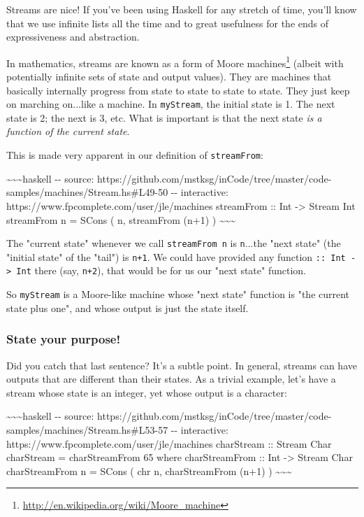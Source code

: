 \documentclass[]{article}
\renewcommand{\href}[2]{#2\footnote{\url{#1}}}
\begin{document}
Streams are nice! If you've been using Haskell for any stretch of time, you'll
know that we use infinite lists all the time and to great usefulness for the
ends of expressiveness and abstraction.

In mathematics, streams are known as a form of
\href{http://en.wikipedia.org/wiki/Moore_machine}{Moore machines} (albeit with
potentially infinite sets of state and output values). They are machines that
basically internally progress from state to state to state to state. They just
keep on marching on...like a machine. In \texttt{myStream}, the initial state is
1. The next state is 2; the next is 3, etc. What is important is that the next
state \emph{is a function of the current state}.

This is made very apparent in our definition of \texttt{streamFrom}:

\textasciitilde{}\textasciitilde{}\textasciitilde{}haskell -\/- source:
https://github.com/mstksg/inCode/tree/master/code-samples/machines/Stream.hs\#L49-50
-\/- interactive: https://www.fpcomplete.com/user/jle/machines streamFrom :: Int
-\textgreater{} Stream Int streamFrom n = SCons ( n, streamFrom (n+1) )
\textasciitilde{}\textasciitilde{}\textasciitilde{}

The "current state" whenever we call \texttt{streamFrom\ n} is \texttt{n}...the
"next state" (the "initial state" of the "tail") is \texttt{n+1}. We could have
provided any function \texttt{::\ Int\ -\textgreater{}\ Int} there (say,
\texttt{n+2}), that would be for us our "next state" function.

So \texttt{myStream} is a Moore-like machine whose "next state" function is "the
current state plus one", and whose output is just the state itself.

\subsubsection{State your purpose!}

Did you catch that last sentence? It's a subtle point. In general, streams can
have outputs that are different than their states. As a trivial example, let's
have a stream whose state is an integer, yet whose output is a character:

\textasciitilde{}\textasciitilde{}\textasciitilde{}haskell -\/- source:
https://github.com/mstksg/inCode/tree/master/code-samples/machines/Stream.hs\#L53-57
-\/- interactive: https://www.fpcomplete.com/user/jle/machines charStream ::
Stream Char charStream = charStreamFrom 65 where charStreamFrom :: Int
-\textgreater{} Stream Char charStreamFrom n = SCons ( chr n, charStreamFrom
(n+1) ) \textasciitilde{}\textasciitilde{}\textasciitilde{}
\end{document}
